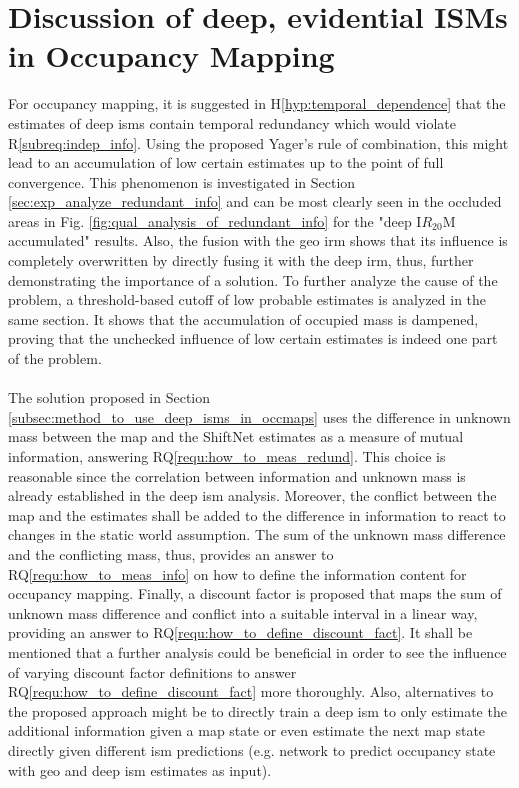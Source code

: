 \section{Discussion of deep, evidential ISMs in Occupancy Mapping}
\label{sec:disc_deep_ev_isms_in_occ_maps}
For occupancy mapping, it is suggested in H\ref{hyp:temporal_dependence} that the estimates of deep \gls{ism}s contain temporal redundancy which would violate R\ref{subreq:indep_info}. Using the proposed Yager's rule of combination, this might lead to an accumulation of low certain estimates up to the point of full convergence. This phenomenon is investigated in Section \ref{sec:exp_analyze_redundant_info} and can be most clearly seen in the occluded areas in Fig. \ref{fig:qual_analysis_of_redundant_info} for the "deep I$R_{20}$M accumulated" results. Also, the fusion with the geo \gls{irm} shows that its influence is completely overwritten by directly fusing it with the deep \gls{irm}, thus, further demonstrating the importance of a solution. To further analyze the cause of the problem, a threshold-based cutoff of low probable estimates is analyzed in the same section. It shows that the accumulation of occupied mass is dampened, proving that the unchecked influence of low certain estimates is indeed one part of the problem.
\\\\
The solution proposed in Section \ref{subsec:method_to_use_deep_isms_in_occmaps} uses the difference in unknown mass between the map and the ShiftNet estimates as a measure of mutual information, answering RQ\ref{requ:how_to_meas_redund}. This choice is reasonable since the correlation between information and unknown mass is already established in the deep \gls{ism} analysis. Moreover, the conflict between the map and the estimates shall be added to the difference in information to react to changes in the static world assumption. The sum of the unknown mass difference and the conflicting mass, thus, provides an answer to RQ\ref{requ:how_to_meas_info} on how to define the information content for occupancy mapping. Finally, a discount factor is proposed that maps the sum of unknown mass difference and conflict into a suitable interval in a linear way, providing an answer to RQ\ref{requ:how_to_define_discount_fact}. It shall be mentioned that a further analysis could be beneficial in order to see the influence of varying discount factor definitions to answer RQ\ref{requ:how_to_define_discount_fact} more thoroughly. Also, alternatives to the proposed approach might be to directly train a deep \gls{ism} to only estimate the additional information given a map state or even estimate the next map state directly given different \gls{ism} predictions (e.g. network to predict occupancy state with geo and deep \gls{ism} estimates as input).
